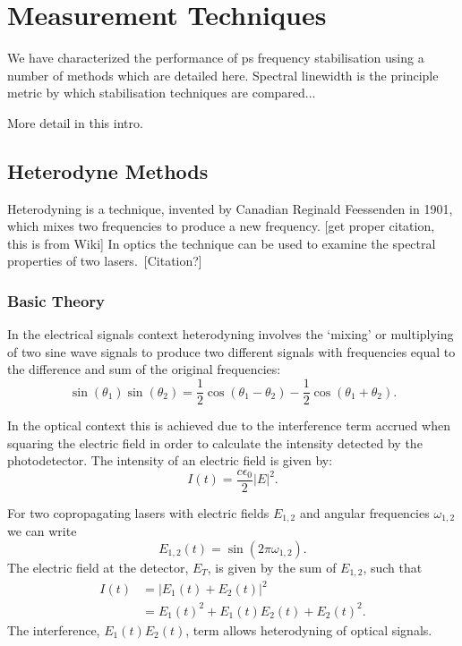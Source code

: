 \chapter{Measurement Techniques}
We have characterized the performance of \gls*{ps} frequency stabilisation using a number of methods which are detailed here. Spectral linewidth is the principle metric by which stabilisation techniques are compared...

{\color{red}More detail in this intro.}

\section{Heterodyne Methods}

Heterodyning is a technique, invented by Canadian Reginald Feessenden in 1901, which mixes two frequencies to produce a new frequency. {\color{red} [get proper citation, this is from Wiki]} In optics the technique can be used to examine the spectral properties of two lasers.~{\color{red}[Citation?]}

\subsection{Basic Theory}
In the electrical signals context heterodyning involves the `mixing' or multiplying of two sine wave signals to produce two different signals with frequencies equal to the difference and sum of the original frequencies:
\begin{equation}
\sin(\theta_1)\sin(\theta_2) = \frac{1}{2} \cos(\theta_1-\theta_2) - \frac{1}{2} \cos(\theta_1+\theta_2).
\end{equation}

In the optical context this is achieved due to the interference term accrued when squaring the electric field in order to calculate the intensity detected by the photodetector. The intensity of an electric field is given by:
\begin{equation}
I(t) = \frac{c\epsilon_0}{2}|E|^2.
\end{equation}

For two copropagating lasers with electric fields $E_{1, 2}$ and angular frequencies $\omega_{1, 2}$ we can write
\begin{equation}
E_{1, 2}(t) = \sin(2\pi \omega_{1, 2}).
\end{equation}
The electric field at the detector, $E_T$, is given by the sum of $E_{1,2}$, such that
\begin{align}
I(t) &= |E_1(t) + E_2(t)|^2\nonumber\\
&= E_1(t)^2 + E_1(t)E_2(t) + E_2(t)^2.
\end{align}
The interference, $E_1(t)E_2(t)$, term allows heterodyning of optical signals.

